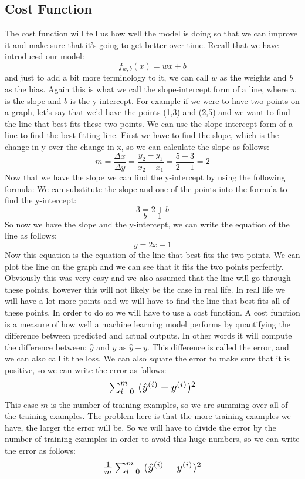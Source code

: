 \subsection{Cost Function}
The cost function will tell us how well the model is doing so that we can improve it and make sure that it's going to get better over time.
Recall that we have introduced our model: $$ f_{w,b}(x) = wx + b $$ and just to add a bit more terminology to it, we can call $w$ as the weights and $b$ as the bias.
Again this is what we call the slope-intercept form of a line, where $w$ is the slope and $b$ is the y-intercept.
For example if we were to have two points on a graph, let's say that we'd have the points (1,3) and (2,5) and we want to find the line that best fits these two points. We can use the slope-intercept form of a line to find the best fitting line.
First we have to find the slope, which is the change in y over the change in x, so we can calculate the slope as follows:
$$ m=\frac{\Delta x}{\Delta y}=\frac{y_2-y_1}{x_2-x_1}={\frac{5-3}{2-1}}=2 $$
Now that we have the slope we can find the y-intercept by using the following formula:
We can substitute the slope and one of the points into the formula to find the y-intercept:
$$ 3=2+b $$
$$ b=1 $$
So now we have the slope and the y-intercept, we can write the equation of the line as follows:
$$ y=2x+1 $$
Now this equation is the equation of the line that best fits the two points. We can plot the line on the graph and we can see that it fits the two points perfectly.
Obviously this was very easy and we also assumed that the line will go through these points, however this will not likely be the case in real life.
In real life we will have a lot more points and we will have to find the line that best fits all of these points. In order to do so we will have to use a cost function.
A cost function is a measure of how well a machine learning model performs by quantifying the difference between predicted and actual outputs.
In other words it will compute the difference between: $\hat{y}$ and $y$ as $\hat{y}-y$.
This difference is called the error, and we can also call it the loss. 
We can also square the error to make sure that it is positive, so we can write the error as follows:
\begin{align*}
    \scalebox{1.3}{$
    \sum_{i=0}^{m}\ (\hat{y}^{(i)}-y^{(i)})^2
  $}
\end{align*}
This case $m$ is the number of training examples, so we are summing over all of the training examples.
The problem here is that the more training examples we have, the larger the error will be. So we will have to divide the error by the number of training examples in order to avoid this huge numbers, so we can write the error as follows:
\begin{align*}
    \scalebox{1.3}{$
    \frac{1}{m}\sum_{i=0}^{m}\ (\hat{y}^{(i)}-y^{(i)})^2
  $}
\end{align*}

